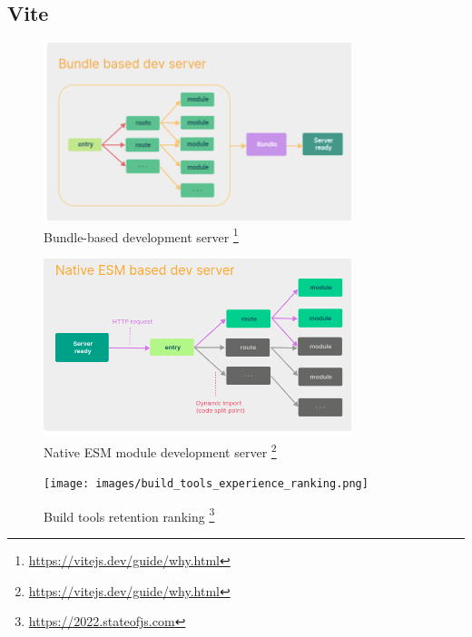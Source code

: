 \documentclass[
]{beamer}
\begin{document}
\subsection[Vite]{Vite}

\begin{frame}
  \begin{figure}
    \includegraphics[width=0.8\textwidth,height=\textheight,keepaspectratio]{images/bundle_dev_server.png}
    \caption{Bundle-based development server
    \footnote{\url{https://vitejs.dev/guide/why.html}}
  }
  \end{figure}
\end{frame}

\begin{frame}
  \begin{figure}
    \includegraphics[width=0.8\textwidth,height=\textheight,keepaspectratio]{images/native_esm_dev_server.png}
    \caption{Native ESM module development server
    \footnote{\url{https://vitejs.dev/guide/why.html}}
  }
  \end{figure}
\end{frame}

\begin{frame}
  \begin{figure}
    \texttt{[image: images/build\_tools\_experience\_ranking.png]}
    \caption{Build tools retention ranking
      \footnote{\url{https://2022.stateofjs.com}}
    }
  \end{figure}
\end{frame}

\makeoutro
\end{document}
